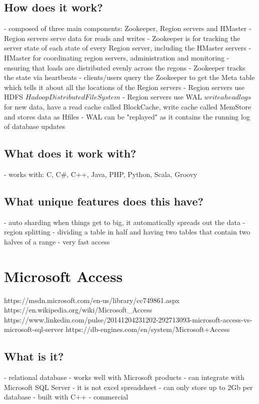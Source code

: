 \section{How does it work?}
- composed of three main components: Zookeeper, Region servers and HMaster
- Region servers serve data for reads and writes
- Zookeeper is for tracking the server state of each state of every Region server, including the HMaster servers
- HMaster for coordinating region servers, administration and monitoring - ensuring that loads are distributed evenly across the regons
- Zookeeper tracks the state via heartbeats
- clients/users query the Zookeeper to get the Meta table which tells it about all the locations of the Region servers
- Region servers use HDFS \(Hadoop Distributed File System\)
- Region servers use WAL \(write ahead logs\) for new data, have a read cache called BlockCache, write cache called MemStore and stores data as Hfiles
- WAL can be "replayed" as it contains the running log of database updates

\section{What does it work with?}
- works with: C, C#, C++, Java, PHP, Python, Scala, Groovy

\section{What unique features does this have?}
- auto sharding when things get to big, it automatically spreads out the data - region splitting - dividing a table in half and having two tables that contain two halves of a range
- very fast access

\chapter{Microsoft Access}
https://msdn.microsoft.com/en-us/library/cc749861.aspx
https://en.wikipedia.org/wiki/Microsoft_Access
https://www.linkedin.com/pulse/20141204231202-292713093-microsoft-access-vs-microsoft-sql-server
https://db-engines.com/en/system/Microsoft+Access%

\section{What is it?}
- relational database
- works well with Microsoft products
- can integrate with Microsoft SQL Server
- it is not excel spreadsheet
- can only store up to 2Gb per database
- built with C++
- commercial

